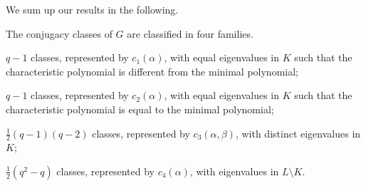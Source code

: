 \documentclass[../main.tex]{subfiles}
\begin{document}
We sum up our results in the following.
\begin{proposition}
	The conjugacy classes of $G$ are classified in four families.
	\begin{listalph}
		\item $q-1$ classes, represented by $c_1(\alpha)$, with equal eigenvalues in $K$ such that the characteristic polynomial is different from the minimal polynomial;
		\item $q-1$ classes, represented by $c_2(\alpha)$, with equal eigenvalues in $K$ such that the characteristic polynomial is equal to the minimal polynomial;
		\item $\frac12(q-1)(q-2)$ classes, represented by $c_3(\alpha,\beta)$, with distinct eigenvalues in $K$;
		\item $\frac12\left(q^2-q\right)$ classes, represented by $c_4(\alpha)$, with eigenvalues in $L\setminus K$.
	\end{listalph}
\end{proposition}
\end{document}
